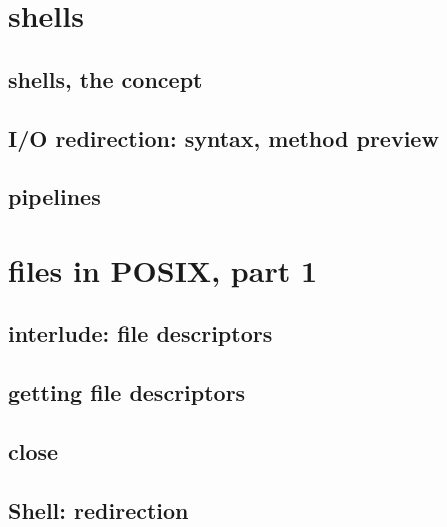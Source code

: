 
\section{shells}

\subsection{shells, the concept}



\subsection{I/O redirection: syntax, method preview}


\subsection{pipelines}


\section{files in POSIX, part 1}

\subsection{interlude: file descriptors}





\subsection{getting file descriptors}



\subsection{close}



\subsection{Shell: redirection}


